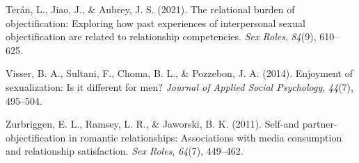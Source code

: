 \documentclass[
  man]{apa6}
\newlength{\cslhangindent}
\newlength{\cslentryspacingunit} %
\newenvironment{CSLReferences}[2] %
 {%
  \setlength{\parindent}{0pt}
  \ifodd #1
  \let\oldpar\par
  \def\par{\hangindent=\cslhangindent\oldpar}
  \fi
  \setlength{\parskip}{#2\cslentryspacingunit}
 }%
 {}
\begin{document}
\begin{CSLReferences}{1}{0}
\leavevmode{}%
Terán, L., Jiao, J., \& Aubrey, J. S. (2021). The relational burden of objectification: Exploring how past experiences of interpersonal sexual objectification are related to relationship competencies. \emph{Sex Roles}, \emph{84}(9), 610--625.

\leavevmode{}%
Visser, B. A., Sultani, F., Choma, B. L., \& Pozzebon, J. A. (2014). Enjoyment of sexualization: Is it different for men? \emph{Journal of Applied Social Psychology}, \emph{44}(7), 495--504.

\leavevmode{}%
Zurbriggen, E. L., Ramsey, L. R., \& Jaworski, B. K. (2011). Self-and partner-objectification in romantic relationships: Associations with media consumption and relationship satisfaction. \emph{Sex Roles}, \emph{64}(7), 449--462.

\end{CSLReferences}

\endgroup
\end{document}

